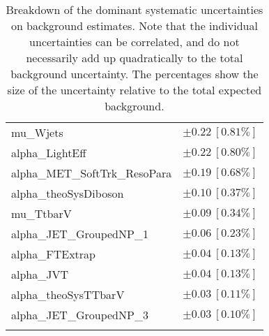 \begin{table}
\begin{center}
\begin{tabular*}{\textwidth}{@{\extracolsep{\fill}}lc}
mu\_Wjets         & $\pm 0.22\ [0.81\%] $       \\
alpha\_LightEff         & $\pm 0.22\ [0.80\%] $       \\
alpha\_MET\_SoftTrk\_ResoPara         & $\pm 0.19\ [0.68\%] $       \\
alpha\_theoSysDiboson         & $\pm 0.10\ [0.37\%] $       \\
mu\_TtbarV         & $\pm 0.09\ [0.34\%] $       \\
alpha\_JET\_GroupedNP\_1         & $\pm 0.06\ [0.23\%] $       \\
alpha\_FTExtrap         & $\pm 0.04\ [0.13\%] $       \\
alpha\_JVT         & $\pm 0.04\ [0.13\%] $       \\
alpha\_theoSysTTbarV         & $\pm 0.03\ [0.11\%] $       \\
alpha\_JET\_GroupedNP\_3         & $\pm 0.03\ [0.10\%] $       \\
\noalign{\smallskip}\hline\noalign{\smallskip}
\end{tabular*}
\end{center}
\caption[Breakdown of uncertainty on background estimates]{
Breakdown of the dominant systematic uncertainties on background estimates.
Note that the individual uncertainties can be correlated, and do not necessarily add up quadratically to 
the total background uncertainty. The percentages show the size of the uncertainty relative to the total expected background.
\label{table.results.bkgestimate.uncertainties.SRC2}}
\end{table}
%